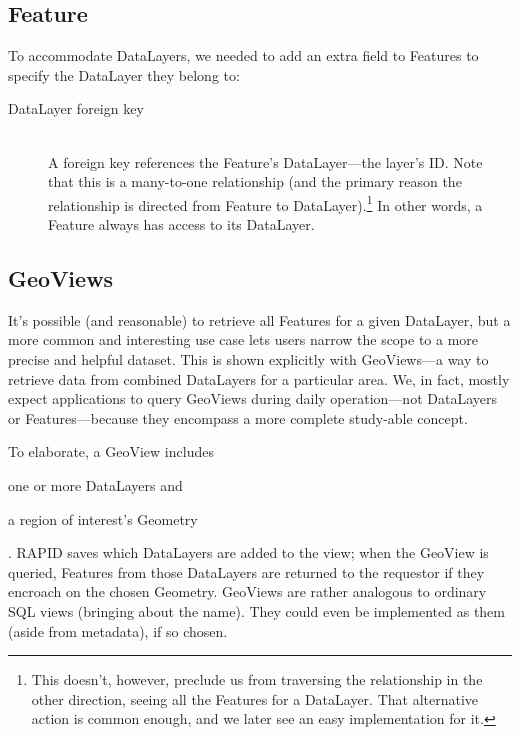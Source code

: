 \subsection{Feature}
To accommodate DataLayers, we needed to add an extra field to Features to specify the DataLayer they belong to:

\begin{description}

\item[DataLayer foreign key] \hfill \\
A foreign key references the Feature's DataLayer---the layer's ID. Note that this is a many-to-one relationship (and the primary reason the relationship is directed from Feature to DataLayer).\footnote{This doesn't, however, preclude us from traversing the relationship in the other direction, seeing all the Features for a DataLayer. That alternative action is common enough, and we later see an easy implementation for it.} In other words, a Feature always has access to its DataLayer.

\end{description}


\subsection{GeoViews}

It's possible (and reasonable) to retrieve all Features for a given DataLayer, but a more common and interesting use case lets users narrow the scope to a more precise and helpful dataset. This is shown explicitly with GeoViews---a way to retrieve data from combined DataLayers for a particular area. We, in fact, mostly expect applications to query GeoViews during daily operation---not DataLayers or Features---because they encompass a more complete study-able concept.

To elaborate, a GeoView includes 
\begin{enumerate*}[label=\itshape\alph*\upshape)]
\item one or more DataLayers and
\item a region of interest's Geometry
\end{enumerate*}. RAPID saves which DataLayers are added to the view; when the GeoView is queried, Features from those DataLayers are returned to the requestor if they encroach on the chosen Geometry. GeoViews are rather analogous to ordinary SQL views (bringing about the name). They could even be implemented as them (aside from metadata), if so chosen.


